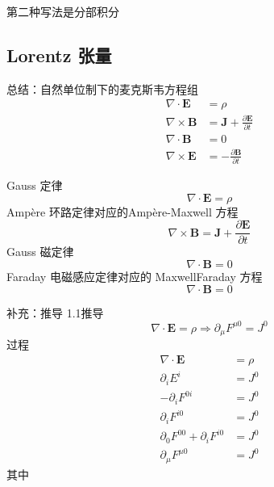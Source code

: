 第二种写法是分部积分



\subsection{Lorentz 张量}





















总结：自然单位制下的麦克斯韦方程组
\begin{equation}
    \begin{aligned}
        \nabla \cdot \mathbf{E}&=\rho 
\\
\nabla \times \mathbf{B}&=\mathbf{J}+\frac{\partial \mathbf{E}}{\partial t}
\\
\nabla \cdot \mathbf{B}&=0
\\
\nabla \times \mathbf{E}&=-\frac{\partial \mathbf{B}}{\partial t}
    \end{aligned}
\end{equation}

Gauss 定律
\begin{equation}
    \nabla \cdot \mathbf{E}=\rho 
\end{equation}
Ampère 环路定律对应的Ampère-Maxwell 方程
\begin{equation}
    \nabla \times \mathbf{B}=\mathbf{J}+\frac{\partial \mathbf{E}}{\partial t}
\end{equation}
Gauss 磁定律
\begin{equation}
    \nabla \cdot \mathbf{B}=0
\end{equation}
Faraday 电磁感应定律对应的 MaxwellFaraday 方程
\begin{equation}
    \nabla \cdot \mathbf{B}=0
\end{equation}

补充：推导
1.1推导
\begin{equation}
    \nabla \cdot \mathbf{E}=\rho \Rightarrow \partial _{\mu}F^{\mu 0}=J^0
\end{equation}
过程
\begin{equation}
    \begin{aligned}
        \nabla \cdot \mathbf{E}&=\rho 
\\
\partial _iE^i&=J^0
\\
-\partial _iF^{0i}&=J^0
\\
\partial _iF^{i0}&=J^0
\\
\partial _0F^{00}+\partial _iF^{i0}&=J^0
\\
\partial _{\mu}F^{\mu 0}&=J^0
    \end{aligned}
\end{equation}
其中






